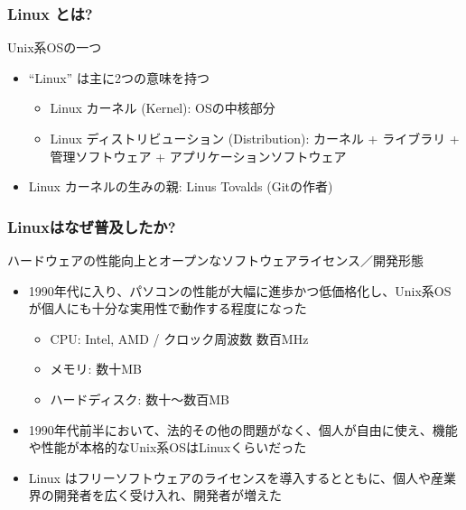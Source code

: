 \documentclass[dvipdfmx]{beamer}
\begin{document}
\begin{frame}
    \frametitle{Linux とは? \cite{linuxfoundation}}

    \begin{block}{Unix系OSの一つ}
        \begin{itemize}
            \item ``Linux'' は主に2つの意味を持つ
            \begin{itemize}
                \item Linux カーネル (Kernel): OSの中核部分
                \item Linux ディストリビューション (Distribution): カーネル + ライブラリ + 管理ソフトウェア + アプリケーションソフトウェア 
            \end{itemize}
            \item Linux カーネルの生みの親: Linus Tovalds (Gitの作者)
        \end{itemize}
    \end{block}
\end{frame}

\begin{frame}
    \frametitle{Linuxはなぜ普及したか?}

    \begin{block}{ハードウェアの性能向上とオープンなソフトウェアライセンス／開発形態}
        \begin{itemize}
            \item 1990年代に入り、パソコンの性能が大幅に進歩かつ低価格化し、Unix系OSが個人にも十分な実用性で動作する程度になった
            \begin{itemize}
                \item CPU: Intel, AMD / クロック周波数 数百MHz
                \item メモリ: 数十MB
                \item ハードディスク: 数十〜数百MB
            \end{itemize}
            \item 1990年代前半において、法的その他の問題がなく、個人が自由に使え、機能や性能が本格的なUnix系OSはLinuxくらいだった
            \item Linux はフリーソフトウェアのライセンスを導入するとともに、個人や産業界の開発者を広く受け入れ、開発者が増えた
        \end{itemize}
    \end{block}
\end{frame}
\end{document}
